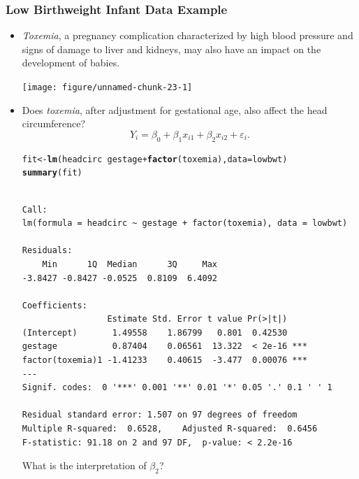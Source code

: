 \documentclass{article}\usepackage[]{graphicx}\usepackage[svgnames]{xcolor}
\makeatletter
\newcommand{\hlopt}[1]{\textcolor[rgb]{0,0,0}{#1}}%
\newcommand{\hlstd}[1]{\textcolor[rgb]{0.345,0.345,0.345}{#1}}%
\newcommand{\hlkwb}[1]{\textcolor[rgb]{0.69,0.353,0.396}{#1}}%
\newcommand{\hlkwc}[1]{\textcolor[rgb]{0.333,0.667,0.333}{#1}}%
\newcommand{\hlkwd}[1]{\textcolor[rgb]{0.737,0.353,0.396}{\textbf{#1}}}%
\newenvironment{kframe}{%
 \def\at@end@of@kframe{}%
 \ifinner\ifhmode%
  \def\at@end@of@kframe{\end{minipage}}%
  \begin{minipage}{\columnwidth}%
 \fi\fi%
 \def\FrameCommand##1{\hskip\@totalleftmargin \hskip-\fboxsep
 \colorbox{shadecolor}{##1}\hskip-\fboxsep
     \hskip-\linewidth \hskip-\@totalleftmargin \hskip\columnwidth}%
 \MakeFramed {\advance\hsize-\width
   \@totalleftmargin\z@ \linewidth\hsize
   \@setminipage}}%
 {\par\unskip\endMakeFramed%
 \at@end@of@kframe}
\newenvironment{knitrout}{}{} %
\makeatother
\begin{document}
\subsubsection*{Low Birthweight Infant Data Example}
\begin{itemize}
      \item \emph{Toxemia}, a pregnancy complication characterized by high blood pressure
            and signs of damage to liver and kidneys, may also have an impact on the
            development of babies.
\begin{knitrout}
\color{fgcolor}

{\centering \texttt{[image: figure/unnamed-chunk-23-1]} 

}


\end{knitrout}
      \item Does \emph{toxemia}, after adjustment for gestational age, also affect the head
            circumference?
            \[ Y_i=\beta_0+\beta_1x_{i1}+\beta_2x_{i2}+\varepsilon_i. \]
\begin{knitrout}
\color{fgcolor}\begin{kframe}
\begin{alltt}
\hlstd{fit} \hlkwb{<-} \hlkwd{lm}\hlstd{(headcirc} \hlopt{~} \hlstd{gestage} \hlopt{+} \hlkwd{factor}\hlstd{(toxemia),} \hlkwc{data} \hlstd{= lowbwt)}
\hlkwd{summary}\hlstd{(fit)}
\end{alltt}
\begin{verbatim}

Call:
lm(formula = headcirc ~ gestage + factor(toxemia), data = lowbwt)

Residuals:
    Min      1Q  Median      3Q     Max 
-3.8427 -0.8427 -0.0525  0.8109  6.4092 

Coefficients:
                 Estimate Std. Error t value Pr(>|t|)    
(Intercept)       1.49558    1.86799   0.801  0.42530    
gestage           0.87404    0.06561  13.322  < 2e-16 ***
factor(toxemia)1 -1.41233    0.40615  -3.477  0.00076 ***
---
Signif. codes:  0 '***' 0.001 '**' 0.01 '*' 0.05 '.' 0.1 ' ' 1

Residual standard error: 1.507 on 97 degrees of freedom
Multiple R-squared:  0.6528,	Adjusted R-squared:  0.6456 
F-statistic: 91.18 on 2 and 97 DF,  p-value: < 2.2e-16
\end{verbatim}
\end{kframe}
\end{knitrout}
            What is the interpretation of $ \beta_2 $?


\end{itemize}
\end{document}
